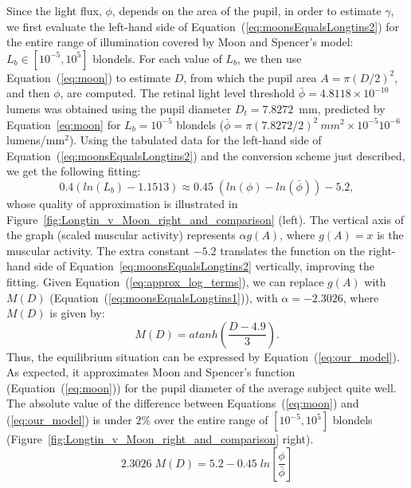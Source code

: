 \documentclass{acmtog} %
\begin{document}
Since the light flux, $\phi$, depends on the area of the pupil, in order
to estimate $\gamma$, we first evaluate the left-hand side of
Equation~(\ref{eq:moonsEqualsLongtins2}) for the entire range of
illumination covered by Moon and Spencer's model: $L_b \in [10^{-5},
10^{5}]$ blondels. For each value of $L_b$, we then use
Equation~(\ref{eq:moon}) to estimate $D$, from which the pupil area $A =
\pi(D/2)^2$, and then $\phi$, are computed. The retinal light level
threshold $\bar{\phi} = 4.8118\times10^{-10}$ lumens was obtained using
the pupil diameter $D_t=7.8272$~mm, predicted by Equation~\ref{eq:moon}
for $L_b = 10^{-5}$ blondels ($\bar{\phi} = \pi(7.8272 / 2)^2~mm^2
\times 10^{-5} 10^{-6}$ lumens/mm$^2$). Using the tabulated data for the
left-hand side of Equation~(\ref{eq:moonsEqualsLongtins2}) and the
conversion scheme just described, we get the following fitting:
\begin{equation}
  0.4 ( {{ln}}(L_{b}) -1.1513)      \approx  0.45 \; ({{ln}}(\phi) - {{ln}}(\bar{\phi})) -5.2,
 \label{eq:approx_log_terms}
\end{equation}
whose quality of approximation is illustrated in
Figure~\ref{fig:Longtin_v_Moon_right_and_comparison} (left). The
vertical axis of the graph (scaled muscular activity) represents $\alpha
g(A)$, where $g(A) = x$ is the muscular activity. The extra constant
$-5.2$ translates the function on the right-hand side of
Equation~\ref{eq:moonsEqualsLongtins2} vertically, improving the
fitting. Given Equation~(\ref{eq:approx_log_terms}), we can replace
$g(A)$ with $M(D)$ (Equation~(\ref{eq:moonsEqualsLongtins1})), with
$\alpha = -2.3026$, where $M(D)$ is given by:
\begin{equation}
  M(D) = {{atanh}} \left( \frac{D-4.9}{3} \right).
  \label{eq:our_function_for_elasto_mechanical_prop}
\end{equation}
Thus, the equilibrium situation can be expressed by
Equation~(\ref{eq:our_model}). As expected, it approximates Moon and
Spencer's function (Equation~(\ref{eq:moon})) for the pupil diameter of
the average subject quite well. The absolute value of the difference
between Equations~(\ref{eq:moon}) and (\ref{eq:our_model}) is under
$2\%$ over the entire range of $[10^{-5}, 10^{5}]$ blondels
(Figure~\ref{fig:Longtin_v_Moon_right_and_comparison} right).
\begin{equation}
\label{eq:our_model}
  2.3026 \; M(D)  =  5.2 - 0.45 \; {{ln}} \left[\frac{\phi}{\bar{\phi}} \right]
\end{equation}
%
\end{document}
